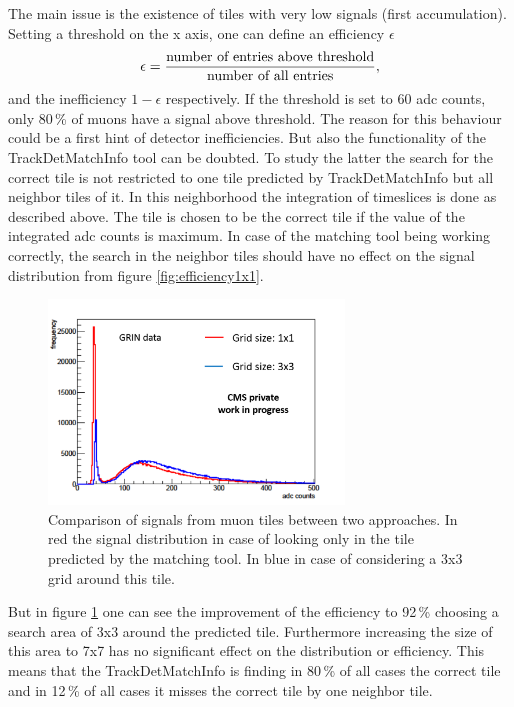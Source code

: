 			The main issue is the existence of tiles with very low signals (first accumulation).
			Setting a threshold on the x axis, one can define an efficiency $\epsilon$
			\begin{equation}
				\epsilon = \frac{\textnormal{number of entries above threshold}}{\textnormal{number of all entries}},
			\end{equation}
			and the inefficiency $1-\epsilon$ respectively.
			If the threshold is set to 60 adc counts, only 80\,\% of muons have a signal above threshold.
			The reason for this behaviour could be a first hint of detector inefficiencies.
			But also the functionality of the TrackDetMatchInfo tool can be doubted.
			To study the latter the search for the correct tile is not restricted to one tile predicted by TrackDetMatchInfo but all neighbor tiles of it.
			In this neighborhood the integration of timeslices is done as described above.
			The tile is chosen to be the correct tile if the value of the integrated adc counts is maximum.
			In case of the matching tool being working correctly, the search in the neighbor tiles should have no effect on the signal distribution from figure \ref{fig:efficiency1x1}.
			\begin{figure}[htbp]
				\centering
				\includegraphics[width=0.70\textwidth]{Figures/erdogan/neighborhood.png}
				\caption{Comparison of signals from muon tiles between two approaches. In red the signal distribution in case of looking only in the tile predicted by the matching tool. In blue in case of
				considering a 3x3 grid around this tile.}
				\label{fig:neighborhood}
			\end{figure}
			But in figure \ref{fig:neighborhood} one can see the improvement of the efficiency to 92\,\% choosing a search area of 3x3 around the predicted tile.
			Furthermore increasing the size of this area to 7x7 has no significant effect on the distribution or efficiency.
			This means that the TrackDetMatchInfo is finding in 80\,\% of all cases the correct tile and in 12\,\% of all cases it misses the correct tile by one neighbor tile.
